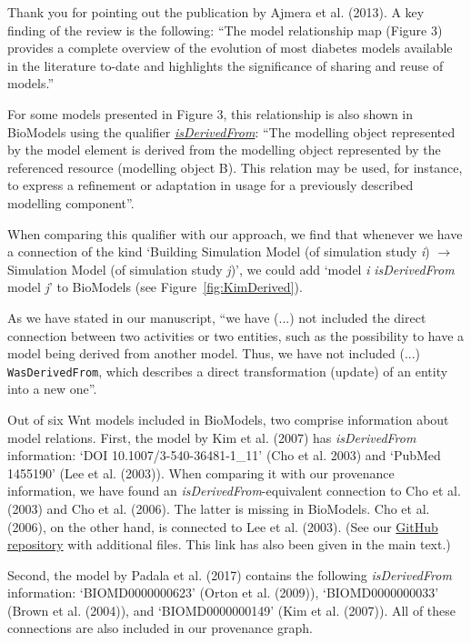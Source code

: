\documentclass{article}
\begin{document}
Thank you for pointing out the publication by Ajmera et al. (2013).
A key finding of the review is the following: \enquote{The model relationship map (Figure 3) provides a complete overview of the evolution of most diabetes models available in the literature to-date and highlights the significance of sharing and reuse of models.}

For some models presented in Figure 3, this relationship is also shown in BioModels using the qualifier \href{http://biomodels.net/model-qualifiers/isDerivedFrom}{\textit{isDerivedFrom}}: \enquote{The modelling object represented by the model element is derived from the modelling object represented by the referenced resource (modelling object B).
This relation may be used, for instance, to express a refinement or adaptation in usage for a previously described modelling component}.

When comparing this qualifier with our approach, we find that whenever we have a connection of the kind `Building Simulation Model (of simulation study \textit{i}) $\longrightarrow$ Simulation Model (of simulation study \textit{j})', we could add `model \textit{i} \textit{isDerivedFrom} model \textit{j}' to BioModels (see Figure~\ref{fig:KimDerived}).

As we have stated in our manuscript, \enquote{we have (...) not included the direct connection between two activities or two entities, such as the possibility to have a model being derived from another model. Thus, we have not included (...)  \texttt{WasDerivedFrom}, which describes a direct transformation (update) of an entity into a new one}.

Out of six Wnt models included in BioModels, two comprise information about model relations.
First, the model by Kim et al. (2007) has \textit{isDerivedFrom} information: `DOI 10.1007/3-540-36481-1\_11' (Cho et al. 2003) and `PubMed 1455190' (Lee et al. (2003)).
When comparing it with our provenance information, we have found an \textit{isDerivedFrom}-equivalent connection to Cho et al. (2003) and Cho et al. (2006).
The latter is missing in BioModels.
Cho et al. (2006), on the other hand, is connected to Lee et al. (2003).
(See our \href{https://github.com/SFB-ELAINE/SI_Provenance_Wnt_Family/tree/main/ProvenanceInformation}{GitHub repository} with additional files.
This link has also been given in the main text.)

Second, the model by Padala et al. (2017) contains the following \textit{isDerivedFrom} information: `BIOMD0000000623' (Orton et al. (2009)), `BIOMD0000000033' (Brown et al. (2004)), and `BIOMD0000000149' (Kim et al. (2007)).
All of these connections are also included in our provenance graph.
\end{document}

